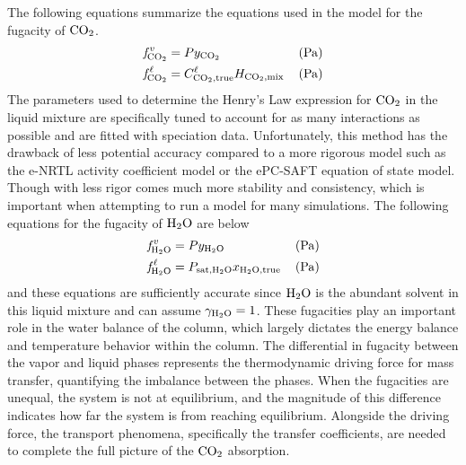 \documentclass[a4paper,fleqn]{cas-sc}
\newcommand{\COtwo}{{\ce{CO2}}}
\newcommand{\HtwoO}{{\ce{H2O}}}
\newcommand{\liq}{\ell}
\newcommand{\vap}{v}
\begin{document}
    The following equations summarize the equations used in the model for the fugacity of $\COtwo$.
    \begin{align}
        \textit{f}^{\:\vap}_{ \COtwo} &= P y_{\COtwo} && \left(\unit{Pa} \right)\\
        \textit{f}^{\:\liq}_{ \COtwo} &= C^{\liq}_{ \COtwo, \text{true}} H_{\COtwo,\text{mix}} &&\left(\unit{Pa} \right) \label{eq:ideal}
    \end{align}
    The parameters used to determine the Henry's Law expression for $\COtwo$ in the liquid mixture are specifically tuned to account for as many interactions as possible and are fitted with speciation data. Unfortunately, this method has the drawback of less potential accuracy compared to a more rigorous model such as the e-NRTL activity coefficient model or the ePC-SAFT equation of state model. Though with less rigor comes much more stability and consistency, which is important when attempting to run a model for many simulations.
    The following equations for the fugacity of $\HtwoO$ are below
    \begin{align}
        \textit{f}^{\:\vap}_{ \HtwoO} &= P y_{\HtwoO} && \left(\unit{Pa} \right)\\
        \textit{f}^{\:\liq}_{ \HtwoO} &= P_{\text{sat}, \HtwoO} x_{\HtwoO, \text{true}} && \left(\unit{Pa} \right)
    \end{align}
    and these equations are sufficiently accurate since $\HtwoO$ is the abundant solvent in this liquid mixture and can assume $\gamma_{\HtwoO} = 1$. These fugacities play an important role in the water balance of the column, which largely dictates the energy balance and temperature behavior within the column. The differential in fugacity between the vapor and liquid phases represents the thermodynamic driving force for mass transfer, quantifying the imbalance between the phases. When the fugacities are unequal, the system is not at equilibrium, and the magnitude of this difference indicates how far the system is from reaching equilibrium. Alongside the driving force, the transport phenomena, specifically the transfer coefficients, are needed to complete the full picture of the $\COtwo$ absorption.
\end{document}
